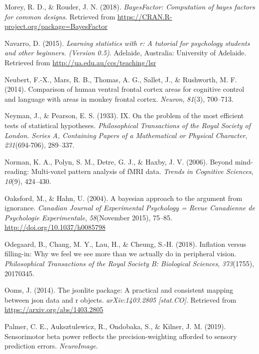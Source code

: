 \documentclass[12pt,twoside]{reedthesis}
\begin{document}
\leavevmode\hypertarget{ref-R-BayesFactor}{}%
Morey, R. D., \& Rouder, J. N. (2018). \emph{BayesFactor: Computation of bayes factors for common designs}. Retrieved from \url{https://CRAN.R-project.org/package=BayesFactor}

\leavevmode\hypertarget{ref-R-lsr}{}%
Navarro, D. (2015). \emph{Learning statistics with r: A tutorial for psychology students and other beginners. (Version 0.5)}. Adelaide, Australia: University of Adelaide. Retrieved from \url{http://ua.edu.au/ccs/teaching/lsr}

\leavevmode\hypertarget{ref-neubert2014comparison}{}%
Neubert, F.-X., Mars, R. B., Thomas, A. G., Sallet, J., \& Rushworth, M. F. (2014). Comparison of human ventral frontal cortex areas for cognitive control and language with areas in monkey frontal cortex. \emph{Neuron}, \emph{81}(3), 700--713.

\leavevmode\hypertarget{ref-neyman1933ix}{}%
Neyman, J., \& Pearson, E. S. (1933). IX. On the problem of the most efficient tests of statistical hypotheses. \emph{Philosophical Transactions of the Royal Society of London. Series A, Containing Papers of a Mathematical or Physical Character}, \emph{231}(694-706), 289--337.

\leavevmode\hypertarget{ref-norman2006beyond}{}%
Norman, K. A., Polyn, S. M., Detre, G. J., \& Haxby, J. V. (2006). Beyond mind-reading: Multi-voxel pattern analysis of fMRI data. \emph{Trends in Cognitive Sciences}, \emph{10}(9), 424--430.

\leavevmode\hypertarget{ref-Oaksford2004}{}%
Oaksford, M., \& Hahn, U. (2004). A bayesian approach to the argument from ignorance. \emph{Canadian Journal of Experimental Psychology = Revue Canadienne de Psychologie Experimentale}, \emph{58}(November 2015), 75--85. \url{http://doi.org/10.1037/h0085798}

\leavevmode\hypertarget{ref-odegaard2018inflation}{}%
Odegaard, B., Chang, M. Y., Lau, H., \& Cheung, S.-H. (2018). Inflation versus filling-in: Why we feel we see more than we actually do in peripheral vision. \emph{Philosophical Transactions of the Royal Society B: Biological Sciences}, \emph{373}(1755), 20170345.

\leavevmode\hypertarget{ref-R-jsonlite}{}%
Ooms, J. (2014). The jsonlite package: A practical and consistent mapping between json data and r objects. \emph{arXiv:1403.2805 {[}stat.CO{]}}. Retrieved from \url{https://arxiv.org/abs/1403.2805}

\leavevmode\hypertarget{ref-palmer2019sensorimotor}{}%
Palmer, C. E., Auksztulewicz, R., Ondobaka, S., \& Kilner, J. M. (2019). Sensorimotor beta power reflects the precision-weighting afforded to sensory prediction errors. \emph{NeuroImage}.
\end{document}
